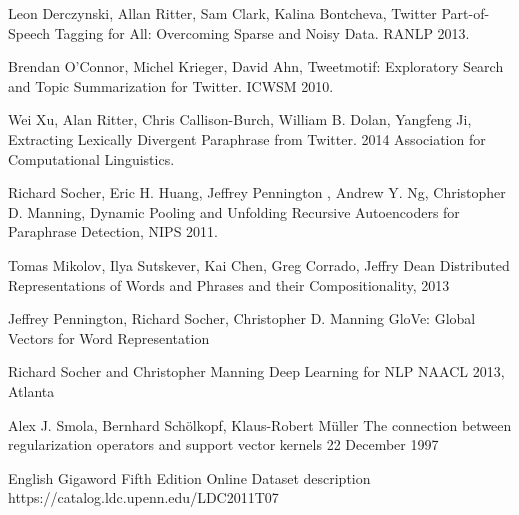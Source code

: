 \documentclass[conference]{IEEEtran}
\begin{document}

%
%
%
\begin{thebibliography}{1}

Leon Derczynski, Allan Ritter, Sam Clark, Kalina Bontcheva, 
Twitter Part-of-Speech Tagging for All: Overcoming Sparse and Noisy Data.
RANLP 2013.

Brendan O’Connor, Michel Krieger, David Ahn,
Tweetmotif: Exploratory Search and Topic Summarization for Twitter.
ICWSM 2010.

Wei Xu, Alan Ritter, Chris Callison-Burch, William B. Dolan, Yangfeng Ji, 
Extracting Lexically Divergent Paraphrase from Twitter. 
2014 Association for Computational Linguistics.

Richard Socher, Eric H. Huang, Jeffrey Pennington
, Andrew Y. Ng, Christopher D. Manning, Dynamic Pooling and Unfolding Recursive
Autoencoders for Paraphrase Detection, NIPS 2011.

Tomas Mikolov, Ilya Sutskever, Kai Chen,
Greg Corrado, Jeffry Dean
Distributed Representations of Words and Phrases
and their Compositionality, 2013

Jeffrey Pennington, Richard Socher, Christopher D. Manning
GloVe: Global Vectors for Word Representation

Richard Socher and Christopher Manning
Deep	 Learning for NLP
NAACL 2013, Atlanta

Alex J. Smola, Bernhard Sch{\"o}lkopf, Klaus-Robert M{\"u}ller
The connection between regularization operators and support vector kernels
 22 December 1997

English Gigaword Fifth Edition
Online Dataset description
https://catalog.ldc.upenn.edu/LDC2011T07

\end{thebibliography}




\end{document}
